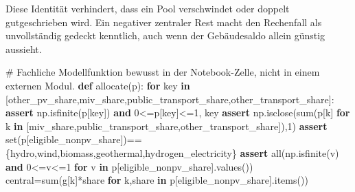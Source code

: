 \documentclass[
  ngerman,
  a4paper,
  DIV=11]{scrreprt}
\newenvironment{Shaded}{\begin{snugshade}}{\end{snugshade}}
\newcommand{\BuiltInTok}[1]{\textcolor[rgb]{0.00,0.23,0.31}{#1}}
\newcommand{\CommentTok}[1]{\textcolor[rgb]{0.37,0.37,0.37}{#1}}
\newcommand{\ControlFlowTok}[1]{\textcolor[rgb]{0.00,0.23,0.31}{\textbf{#1}}}
\newcommand{\DecValTok}[1]{\textcolor[rgb]{0.68,0.00,0.00}{#1}}
\newcommand{\KeywordTok}[1]{\textcolor[rgb]{0.00,0.23,0.31}{\textbf{#1}}}
\newcommand{\NormalTok}[1]{\textcolor[rgb]{0.00,0.23,0.31}{#1}}
\newcommand{\OperatorTok}[1]{\textcolor[rgb]{0.37,0.37,0.37}{#1}}
\newcommand{\StringTok}[1]{\textcolor[rgb]{0.13,0.47,0.30}{#1}}
\begin{document}
Diese Identität verhindert, dass ein Pool verschwindet oder doppelt
gutgeschrieben wird. Ein negativer zentraler Rest macht den Rechenfall
als unvollständig gedeckt kenntlich, auch wenn der Gebäudesaldo allein
günstig aussieht.

\begin{Shaded}
\begin{Highlighting}[]
\CommentTok{\# Fachliche Modellfunktion bewusst in der Notebook{-}Zelle, nicht in einem externen Modul.}
\KeywordTok{def}\NormalTok{ allocate(p):}
    \ControlFlowTok{for}\NormalTok{ key }\KeywordTok{in}\NormalTok{ [}\StringTok{\textquotesingle{}other\_pv\_share\textquotesingle{}}\NormalTok{,}\StringTok{\textquotesingle{}miv\_share\textquotesingle{}}\NormalTok{,}\StringTok{\textquotesingle{}public\_transport\_share\textquotesingle{}}\NormalTok{,}\StringTok{\textquotesingle{}other\_transport\_share\textquotesingle{}}\NormalTok{]:}
        \ControlFlowTok{assert}\NormalTok{ np.isfinite(p[key]) }\KeywordTok{and} \DecValTok{0}\OperatorTok{\textless{}=}\NormalTok{p[key]}\OperatorTok{\textless{}=}\DecValTok{1}\NormalTok{, key}
    \ControlFlowTok{assert}\NormalTok{ np.isclose(}\BuiltInTok{sum}\NormalTok{(p[k] }\ControlFlowTok{for}\NormalTok{ k }\KeywordTok{in}\NormalTok{ [}\StringTok{\textquotesingle{}miv\_share\textquotesingle{}}\NormalTok{,}\StringTok{\textquotesingle{}public\_transport\_share\textquotesingle{}}\NormalTok{,}\StringTok{\textquotesingle{}other\_transport\_share\textquotesingle{}}\NormalTok{]),}\DecValTok{1}\NormalTok{)}
    \ControlFlowTok{assert} \BuiltInTok{set}\NormalTok{(p[}\StringTok{\textquotesingle{}eligible\_nonpv\_share\textquotesingle{}}\NormalTok{])}\OperatorTok{==}\NormalTok{\{}\StringTok{\textquotesingle{}hydro\textquotesingle{}}\NormalTok{,}\StringTok{\textquotesingle{}wind\textquotesingle{}}\NormalTok{,}\StringTok{\textquotesingle{}biomass\textquotesingle{}}\NormalTok{,}\StringTok{\textquotesingle{}geothermal\textquotesingle{}}\NormalTok{,}\StringTok{\textquotesingle{}hydrogen\_electricity\textquotesingle{}}\NormalTok{\}}
    \ControlFlowTok{assert} \BuiltInTok{all}\NormalTok{(np.isfinite(v) }\KeywordTok{and} \DecValTok{0}\OperatorTok{\textless{}=}\NormalTok{v}\OperatorTok{\textless{}=}\DecValTok{1} \ControlFlowTok{for}\NormalTok{ v }\KeywordTok{in}\NormalTok{ p[}\StringTok{\textquotesingle{}eligible\_nonpv\_share\textquotesingle{}}\NormalTok{].values())}
\NormalTok{    central}\OperatorTok{=}\BuiltInTok{sum}\NormalTok{(g[k]}\OperatorTok{*}\NormalTok{share }\ControlFlowTok{for}\NormalTok{ k,share }\KeywordTok{in}\NormalTok{ p[}\StringTok{\textquotesingle{}eligible\_nonpv\_share\textquotesingle{}}\NormalTok{].items())}

\end{Highlighting}
\end{Shaded}
\end{document}
